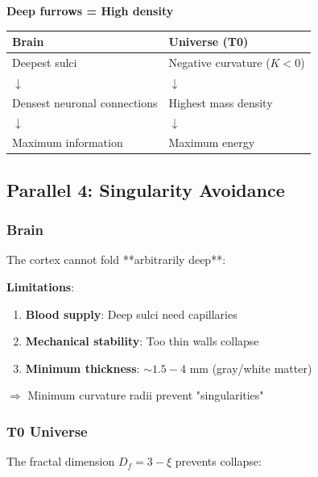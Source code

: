 	\begin{keyresult}
		\textbf{Deep furrows = High density}
		
		\vspace{0.3cm}
		
		\begin{center}
			\begin{tabular}{p{4cm}|p{4cm}}
				\toprule
				\textbf{Brain} & \textbf{Universe (T0)} \\
				\midrule
				Deepest sulci & Negative curvature ($K<0$) \\
				$\downarrow$ & $\downarrow$ \\
				Densest neuronal connections & Highest mass density \\
				$\downarrow$ & $\downarrow$ \\
				Maximum information & Maximum energy \\
				\bottomrule
			\end{tabular}
		\end{center}
	\end{keyresult}
	
	\subsection{Parallel 4: Singularity Avoidance}
	
	\subsubsection{Brain}
	
	The cortex cannot fold **arbitrarily deep**:
	
	\textbf{Limitations}:
	\begin{enumerate}
		\item \textbf{Blood supply}: Deep sulci need capillaries
		\item \textbf{Mechanical stability}: Too thin walls collapse
		\item \textbf{Minimum thickness}: $\sim 1.5 - 4$ mm (gray/white matter)
	\end{enumerate}
	
	$\Rightarrow$ Minimum curvature radii prevent "singularities"
	
	\subsubsection{T0 Universe}
	
	The fractal dimension $D_f = 3 - \xi$ prevents collapse:
	
